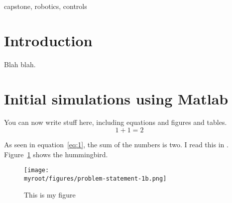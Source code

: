 \documentclass[onecolumn,10pt]{IEEEtran}
\newcommand{\myroot}{../}
\newcommand{\MATLAB}{Matlab}
\begin{document}
\begin{IEEEkeywords}
capstone, robotics, controls
\end{IEEEkeywords}

\section{Introduction}
Blah blah. 


\section{Initial simulations using \MATLAB}
You can now write stuff here, including equations and figures and tables.
\begin{equation}
1+1 = 2
\label{eq:1}
\end{equation}

As seen in equation~\ref{eq:1}, the sum of the numbers is two. I read this in \cite{clark2009courtship}. Figure~\ref{fig:otto} shows the hummingbird.

\begin{figure}
\begin{center}
\texttt{[image: \\myroot/figures/problem-statement-1b.png]}
\end{center}
\caption{This is my figure}
\label{fig:otto}
\end{figure}
\end{document}

